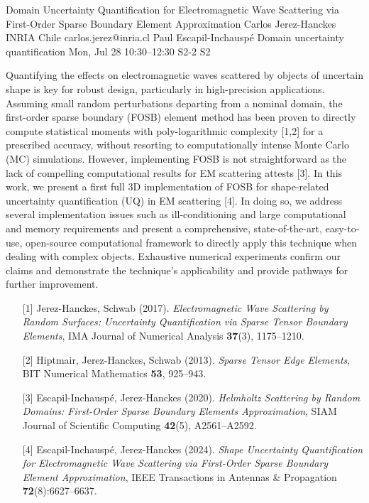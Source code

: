 \begin{talk}
  {Domain Uncertainty Quantification for Electromagnetic Wave Scattering via First-Order Sparse Boundary Element Approximation}%
  {Carlos Jerez-Hanckes}%
  {INRIA Chile}%
  {carlos.jerez@inria.cl}%
  {Paul Escapil-Inchausp\'e}%
  {Domain uncertainty quantification}%
  {Mon, Jul 28 10:30–12:30}%
  {S2-2}%
  {S2}%
				
			
Quantifying the effects on electromagnetic waves scattered by objects of uncertain shape is key for robust design, particularly in high-precision applications. Assuming small random perturbations departing from a nominal domain, the first-order sparse boundary (FOSB) element method has been proven to directly compute statistical moments with poly-logarithmic complexity [1,2] for a prescribed accuracy, without resorting to computationally intense Monte Carlo (MC) simulations. However, implementing FOSB is not straightforward as the lack of compelling computational results for EM scattering attests [3]. In this work, we present a first full 3D implementation of FOSB for shape-related uncertainty quantification (UQ) in EM scattering [4]. In doing so, we address several implementation issues such as ill-conditioning and large computational and memory requirements and present a comprehensive, state-of-the-art, easy-to-use, open-source computational framework to directly apply this technique when dealing with complex objects. Exhaustive numerical experiments confirm our claims and demonstrate the technique's applicability and provide pathways for further improvement.

\medskip

\begin{enumerate}
	\item[{[1]}] Jerez-Hanckes, Schwab (2017). {\it Electromagnetic Wave Scattering by Random Surfaces: Uncertainty Quantification via Sparse Tensor Boundary Elements}, IMA Journal of Numerical Analysis {\bf 37}(3), 1175--1210.
	\item[{[2]}] Hiptmair, Jerez-Hanckes, Schwab (2013). {\it Sparse Tensor Edge Elements}, BIT Numerical Mathematics {\bf 53}, 925--943.
	\item[{[3]}] Escapil-Inchausp\'e, Jerez-Hanckes (2020). {\it Helmholtz Scattering by Random Domains: First-Order Sparse Boundary Elements Approximation}, SIAM Journal of Scientific Computing {\bf 42}(5), A2561--A2592.
	\item[{[4]}] Escapil-Inchausp\'e, Jerez-Hanckes (2024). {\it Shape Uncertainty Quantification for Electromagnetic Wave Scattering via First-Order Sparse Boundary Element Approximation}, IEEE Transactions in Antennas \& Propagation {\bf 72}(8):6627--6637.
\end{enumerate}


\end{talk}

